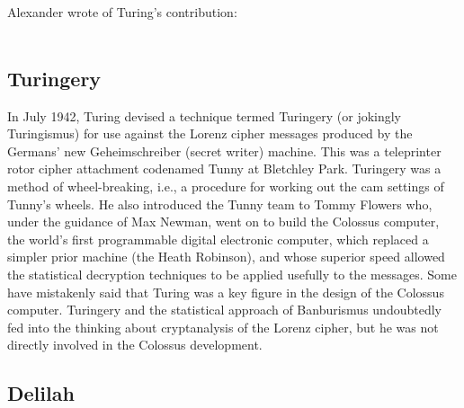 \documentclass{article}
\begin{document}
\\\\
Alexander wrote of Turing's contribution:
\\\\

\subsection{Turingery}

In July 1942, Turing devised a technique termed Turingery (or jokingly Turingismus) for use against the Lorenz cipher messages produced by the Germans' new Geheimschreiber (secret writer) machine. This was a teleprinter rotor cipher attachment codenamed Tunny at Bletchley Park. Turingery was a method of wheel-breaking, i.e., a procedure for working out the cam settings of Tunny's wheels. He also introduced the Tunny team to Tommy Flowers who, under the guidance of Max Newman, went on to build the Colossus computer, the world's first programmable digital electronic computer, which replaced a simpler prior machine (the Heath Robinson), and whose superior speed allowed the statistical decryption techniques to be applied usefully to the messages. Some have mistakenly said that Turing was a key figure in the design of the Colossus computer. Turingery and the statistical approach of Banburismus undoubtedly fed into the thinking about cryptanalysis of the Lorenz cipher, but he was not directly involved in the Colossus development.

\subsection{Delilah}
\end{document}
